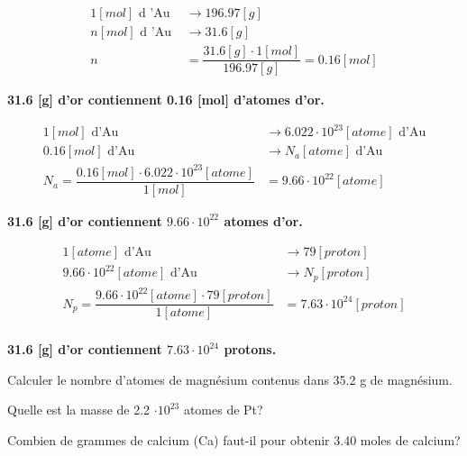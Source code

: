 \documentclass[
  11pt,
  a4paper,
  openany]{book}
\begin{document}
\begin{Answer}
\[ \begin{split}
    1 [mol] \text{ d 'Au } &\longrightarrow 196.97 [g]\\
    n [mol] \text{ d 'Au } &\longrightarrow 31.6 [g]\\
    n &= \dfrac{31.6 [g] \cdot 1 [mol]}{196.97 [g]} = 0.16 [mol]
\end{split} \]

\textbf{31.6 {[}g{]} d'or contiennent 0.16 {[}mol{]} d'atomes d'or.}

\[ \begin{split}
    1 [mol] \text{ d'Au } &\longrightarrow 6.022\cdot 10^{23} [atome] \text{ d'Au}\\
    0.16 [mol] \text{ d'Au } &\longrightarrow N_a [atome] \text{ d'Au}\\
    N_a = \dfrac{0.16 [mol] \cdot 6.022\cdot 10^{23} [atome]}{1 [mol]} &= 9.66\cdot 10^{22} [atome]
\end{split} \]

\textbf{31.6 {[}g{]} d'or contiennent \(9.66\cdot 10^{22}\) atomes d'or.}

\[ \begin{split}
    1 [atome] \text{ d'Au } &\longrightarrow 79 [proton]\\
    9.66\cdot 10^{22} [atome] \text{ d'Au } &\longrightarrow N_{p} [proton]\\
    N_p = \dfrac{9.66\cdot 10^{22} [atome] \cdot 79 [proton]}{1 [atome]} &= 7.63\cdot 10^{24} [proton]\\
\end{split} \]

\textbf{31.6 {[}g{]} d'or contiennent \(7.63\cdot 10^{24}\) protons.}

\end{Answer}

\newpage

\begin{Exercise}

Calculer le nombre d'atomes de magnésium contenus dans 35.2 g de magnésium.


Quelle est la masse de 2.2 \(\cdot 10^{23}\) atomes de Pt?


Combien de grammes de calcium (Ca) faut-il pour obtenir 3.40 moles de calcium?


\end{Exercise}
\end{document}
